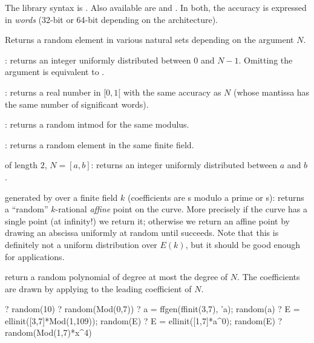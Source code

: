 The library syntax is .
Also available are  and
. In both, the accuracy is expressed in
\emph{words} (32-bit or 64-bit depending on the architecture).

\label{se:random}
Returns a random element in various natural sets depending on the
argument $N$.

\item {}: returns an integer
uniformly distributed between $0$ and $N-1$. Omitting the argument
is equivalent to .

\item {}: returns a real number in $[0,1[$ with the same accuracy as
$N$ (whose mantissa has the same number of significant words).

\item {}: returns a random intmod for the same modulus.

\item {}: returns a random element in the same finite field.

\item {} of length $2$, $N = [a,b]$: returns an integer uniformly
distributed between $a$ and $b$.

\item {} generated by  over a finite field $k$
(coefficients are s modulo a prime or s): returns a
``random'' $k$-rational \emph{affine} point on the curve. More precisely
if the curve has a single point (at infinity!) we return it; otherwise
we return an affine point by drawing an abscissa uniformly at
random until  succeeds. Note that this is definitely not a
uniform distribution over $E(k)$, but it should be good enough for
applications.

\item {} return a random polynomial of degree at most the degree of $N$.
The coefficients are drawn by applying  to the leading
coefficient of $N$.

\bprog
? random(10)
? random(Mod(0,7))
? a = ffgen(ffinit(3,7), 'a); random(a)
? E = ellinit([3,7]*Mod(1,109)); random(E)
? E = ellinit([1,7]*a^0); random(E)
? random(Mod(1,7)*x^4)

